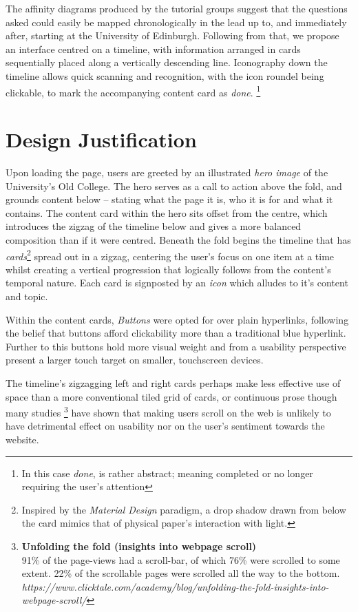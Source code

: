 \documentclass[a4paper, notoc]{tufte-handout}
\begin{document}
The affinity diagrams produced by the tutorial groups suggest that the questions asked could 
easily be mapped chronologically in the lead up to, and immediately after, starting at the 
University of Edinburgh. Following from that, we propose an interface centred on a timeline, 
with information arranged in cards sequentially placed along a vertically descending line. 
Iconography down the timeline allows quick scanning and recognition, with the icon roundel 
being clickable, to mark the accompanying content card as \textit{done}.
\footnote{In this case \textit{done}, is rather abstract; meaning completed or no longer 
requiring the user's attention}


\section{Design Justification}\label{sec:design-justification}

Upon loading the page, users are greeted by an illustrated \textit{hero image} of the 
University's Old College. The hero serves as a call to action above the fold, and grounds 
content below -- stating what the page it is, who it is for and what it contains. The content 
card within the hero sits offset from the centre, which introduces the zigzag of the timeline 
below and gives a more balanced composition than if it were centred. Beneath the fold begins 
the timeline that has \textit{cards}\footnote{Inspired by 
the \textit{Material Design} paradigm, a drop shadow drawn from below the card mimics that 
of physical paper's interaction with light.} spread out in a zigzag, centering the user's 
focus on one item at a time whilst creating a vertical progression that logically follows 
from the content's temporal nature. Each card is signposted by an \textit{icon} which alludes 
to it's content and topic. 

Within the content cards, \textit{Buttons} were opted for over plain hyperlinks, following 
the belief that buttons afford clickability more than a traditional blue hyperlink. Further 
to this buttons hold more visual weight and from a usability perspective present a larger 
touch target on smaller, touchscreen devices.

The timeline's zigzagging left and right cards perhaps make less effective use of space than
a more conventional tiled grid of cards, or continuous prose though many studies
\footnote{\textbf{Unfolding the fold (insights into webpage scroll)}\\
91\% of the page-views had a scroll-bar, of which
76\% were scrolled to some extent.
22\% of the scrollable pages were scrolled all the way to the bottom.
\textit{https://www.clicktale.com/academy/blog/unfolding-the-fold-insights-into-webpage-scroll/}}
have shown that making users scroll on the web is unlikely to have detrimental effect on usability
nor on the user's sentiment towards the website.
\end{document}
